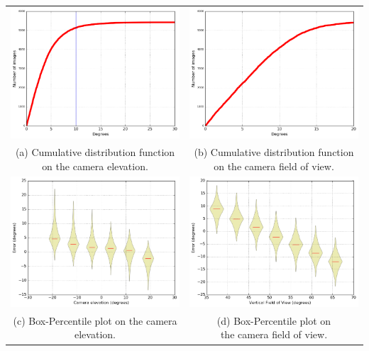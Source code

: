 \begin{tabular}{@{}cc@{}}
\includegraphics[width=0.45\linewidth]{cdf_2.png} &
\includegraphics[width=0.45\linewidth]{cdf_3.png} \\
\small \shortstack{(a) Cumulative distribution function\\ on the camera elevation.} & \small \shortstack{(b) Cumulative distribution function\\ on the camera field of view.} \\
\includegraphics[width=0.45\linewidth]{box-percentile_plot_2.png} &
\includegraphics[width=0.45\linewidth]{box-percentile_plot_3.png} \\
\small (c) Box-Percentile plot on the camera elevation. & \small \shortstack{(d) Box-Percentile plot on\\ the camera field of view.} \\
\end{tabular}

